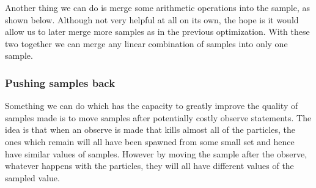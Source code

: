 \documentclass[a4paper]{article}
\begin{document}
Another thing we can do is merge some arithmetic operations into the sample, as shown below. Although not very helpful at all on its own, the hope is it would allow us to later merge more samples as in the previous optimization. With these two together we can merge any linear combination of samples into only one sample.

\begin{center}
\end{center}




\subsubsection{Pushing samples back}

Something we can do which has the capacity to greatly improve the quality of samples made is to move samples after potentially costly observe statements. The idea is that when an observe is made that kills almost all of the particles, the ones which remain will all have been spawned from some small set and hence have similar values of samples. However by moving the sample after the observe, whatever happens with the particles, they will all have different values of the sampled value.
\end{document}

